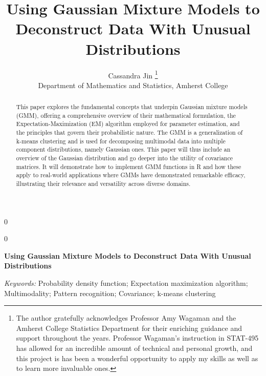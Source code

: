 \documentclass[12pt]{article}
\newcommand{\blind}{0}
\begin{document}
\def\spacingset#1{\renewcommand{\baselinestretch}%
{#1}\small\normalsize} \spacingset{1}



\blind
{
  \title{\bf Using Gaussian Mixture Models to Deconstruct Data With
Unusual Distributions}

  \author{
        Cassandra Jin \thanks{The author gratefully acknowledges
Professor Amy Wagaman and the Amherst College Statistics Department for
their enriching guidance and support throughout the years. Professor
Wagaman's instruction in STAT-495 has allowed for an incredible amount
of technical and personal growth, and this project is has been a
wonderful opportunity to apply my skills as well as to learn more
invaluable ones.} \\
    Department of Mathematics and Statistics, Amherst College\\
      }
  \maketitle
} \fi

\blind
{
  \bigskip
  \bigskip
  \bigskip
  \begin{center}
    {\LARGE\bf Using Gaussian Mixture Models to Deconstruct Data With
Unusual Distributions}
  \end{center}
  \medskip
} \fi

\bigskip
\begin{abstract}
This paper explores the fundamental concepts that underpin Gaussian
mixture models (GMM), offering a comprehensive overview of their
mathematical formulation, the Expectation-Maximization (EM) algorithm
employed for parameter estimation, and the principles that govern their
probabilistic nature. The GMM is a generalization of k-means clustering
and is used for decomposing multimodal data into multiple component
distributions, namely Gaussian ones. This paper will thus include an
overview of the Gaussian distribution and go deeper into the utility of
covariance matrices. It will demonstrate how to implement GMM functions
in R and how these apply to real-world applications where GMMs have
demonstrated remarkable efficacy, illustrating their relevance and
versatility across diverse domains.
\end{abstract}

\noindent%
{\it Keywords:} Probability density function; Expectation maximization
algorithm; Multimodality; Pattern recognition; Covariance; k-means
clustering
\end{document}
